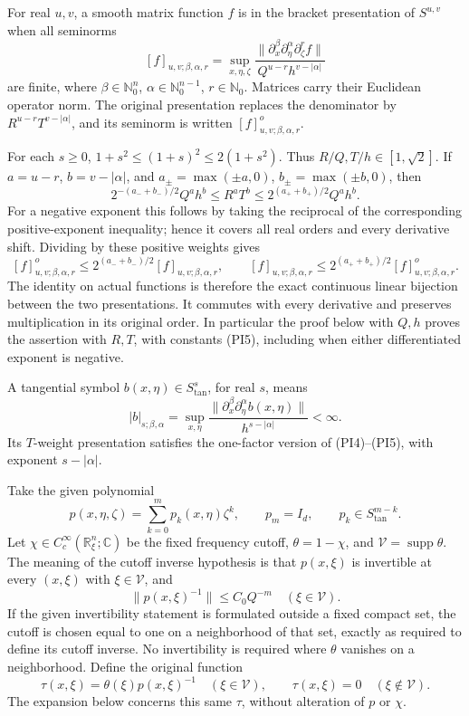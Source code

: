 \documentclass[
  11pt,
]{article}
\begin{document}
For real \(u,v\), a smooth matrix function \(f\) is in the bracket
presentation of \(S^{u,v}\) when all seminorms \[
 [f]_{u,v;\beta,\alpha,r}
 =\sup_{x,\eta,\zeta}
 \frac{\|\partial_x^\beta\partial_\eta^\alpha\partial_\zeta^r f\|}
 {Q^{u-r}h^{v-|\alpha|}}
 \tag{PI3}
\] are finite, where \(\beta\in\mathbb N_0^n\),
\(\alpha\in\mathbb N_0^{n-1}\), \(r\in\mathbb N_0\). Matrices carry
their Euclidean operator norm. The original presentation replaces the
denominator by \(R^{u-r}T^{v-|\alpha|}\), and its seminorm is written
\([f]^o_{u,v;\beta,\alpha,r}\).

For each \(s\geq0\), \(1+s^2\leq(1+s)^2\leq2(1+s^2)\). Thus
\(R/Q,T/h\in[1,\sqrt2]\). If \(a=u-r\), \(b=v-|\alpha|\), and
\(a_\pm=\max(\pm a,0)\), \(b_\pm=\max(\pm b,0)\), then \[
 2^{-(a_-+b_-)/2}Q^ah^b
 \leq R^aT^b
 \leq2^{(a_++b_+)/2}Q^ah^b.
 \tag{PI4}
\] For a negative exponent this follows by taking the reciprocal of the
corresponding positive-exponent inequality; hence it covers all real
orders and every derivative shift. Dividing by these positive weights
gives \[
 [f]^o_{u,v;\beta,\alpha,r}
 \leq2^{(a_-+b_-)/2}[f]_{u,v;\beta,\alpha,r},\qquad
 [f]_{u,v;\beta,\alpha,r}
 \leq2^{(a_++b_+)/2}[f]^o_{u,v;\beta,\alpha,r}.
 \tag{PI5}
\] The identity on actual functions is therefore the exact continuous
linear bijection between the two presentations. It commutes with every
derivative and preserves multiplication in its original order. In
particular the proof below with \(Q,h\) proves the assertion with
\(R,T\), with constants (PI5), including when either differentiated
exponent is negative.

A tangential symbol \(b(x,\eta)\in S^s_{\mathrm{tan}}\), for real \(s\),
means \[
 |b|_{s;\beta,\alpha}
 =\sup_{x,\eta}
 \frac{\|\partial_x^\beta\partial_\eta^\alpha b(x,\eta)\|}
 {h^{s-|\alpha|}}<\infty.
 \tag{PI6}
\] Its \(T\)-weight presentation satisfies the one-factor version of
(PI4)--(PI5), with exponent \(s-|\alpha|\).

Take the given polynomial \[
 p(x,\eta,\zeta)=\sum_{k=0}^{m}p_k(x,\eta)\zeta^k,\qquad
 p_m=I_d,\qquad p_k\in S^{m-k}_{\mathrm{tan}}.
 \tag{PI7}
\] Let \(\chi\in C_c^\infty(\mathbb R_\xi^n;\mathbb C)\) be the fixed
frequency cutoff, \(\theta=1-\chi\), and
\(\mathcal V=\operatorname{supp}\theta\). The meaning of the cutoff
inverse hypothesis is that \(p(x,\xi)\) is invertible at every
\((x,\xi)\) with \(\xi\in\mathcal V\), and \[
 \|p(x,\xi)^{-1}\|\leq C_0Q^{-m}\quad(\xi\in\mathcal V).
 \tag{PI8}
\] If the given invertibility statement is formulated outside a fixed
compact set, the cutoff is chosen equal to one on a neighborhood of that
set, exactly as required to define its cutoff inverse. No invertibility
is required where \(\theta\) vanishes on a neighborhood. Define the
original function \[
 \tau(x,\xi)=\theta(\xi)p(x,\xi)^{-1}\quad(\xi\in\mathcal V),
 \qquad \tau(x,\xi)=0\quad(\xi\notin\mathcal V).
 \tag{PI9}
\] The expansion below concerns this same \(\tau\), without alteration
of \(p\) or \(\chi\).
\end{document}
